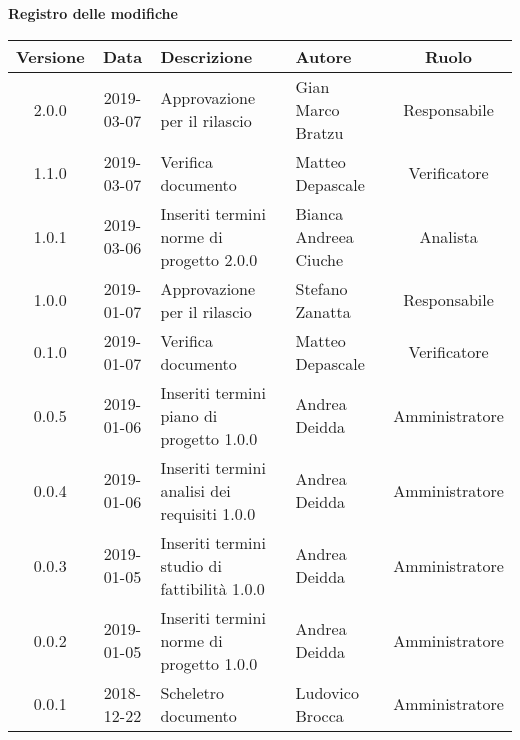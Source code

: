 \begin{center}
	\textbf{Registro delle modifiche}
	\end{center}
	\begin{center}
		\begin{tabularx}{\textwidth}{|c|c|X|X|c|}
			\hline
			\textbf{Versione} & \textbf{Data} & \textbf{Descrizione} & \textbf{Autore} & \textbf{Ruolo} \\
			\hline
			2.0.0 & 2019-03-07 & Approvazione per il rilascio & Gian Marco Bratzu & Responsabile \\
			\hline
			1.1.0 & 2019-03-07 & Verifica documento & Matteo Depascale & Verificatore \\
			\hline
			1.0.1 & 2019-03-06 & Inseriti termini norme di progetto 2.0.0 & Bianca Andreea Ciuche & Analista \\
			\hline
			1.0.0 & 2019-01-07 & Approvazione per il rilascio & Stefano Zanatta & Responsabile \\
			\hline
			0.1.0 & 2019-01-07 & Verifica documento & Matteo Depascale & Verificatore \\
			\hline
			0.0.5 & 2019-01-06 & Inseriti termini piano di progetto 1.0.0 & Andrea Deidda & Amministratore\\
			\hline
			0.0.4 & 2019-01-06 & Inseriti termini analisi dei requisiti 1.0.0 & Andrea Deidda & Amministratore\\
			\hline
			0.0.3 & 2019-01-05 & Inseriti termini studio di fattibilità 1.0.0 & Andrea Deidda & Amministratore\\
			\hline
			0.0.2 & 2019-01-05 & Inseriti termini norme di progetto 1.0.0 & Andrea Deidda & Amministratore\\
			\hline
			0.0.1 & 2018-12-22 & Scheletro documento & Ludovico Brocca & Amministratore\\
			\hline
		\end{tabularx}
	\end{center}
\newpage